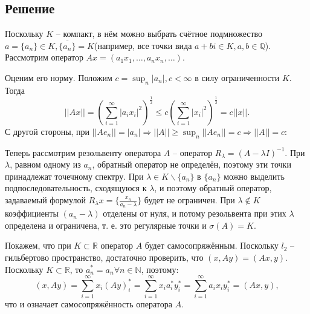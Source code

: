\documentclass[11pt]{article}
\newcounter{th}\setcounter{th}{0}
\begin{document}
\subsection{Решение}
\label{sec:org7840909}
Поскольку \(K\) -- компакт, в нём можно выбрать счётное подмножество \(a = \{a_n\} \in K, \overline{\{a_n\}} = K\)(например, все точки вида \(a + bi \in K, a, b \in \mathbb{Q}\)).
Рассмотрим оператор \(Ax = (a_1x_1, \ldots, a_nx_n, \ldots)\).

Оценим его норму. Положим \(c = \sup_n |a_n|, c < \infty\) в силу ограниченности \(K\). Тогда
\begin{equation*}
||Ax|| = \left(\sum_{i = 1}^{\infty}|a_ix_i|^2\right)^{\frac12} \leq c\left(\sum_{i = 1}^{\infty}|x_i|^2\right)^{\frac12} = c||x||.
\end{equation*}
С другой стороны, при $||Ae_n|| = |a_n| \Rightarrow ||A|| \geq \sup_n||Ae_n|| = c \Rightarrow ||A|| = c$:

Теперь рассмотрим резольвенту оператора \(A\) -- оператор \(R_{\lambda} = (A - \lambda I)^{-1}\). При \(\lambda\), равном одному из \(a_n\), обратный оператор не определён, поэтому эти точки принадлежат точечному спектру. При \(\lambda \in K \backslash \{a_n\}\) в \(\{a_n\}\) можно выделить подпоследовательность, сходящуюся к \(\lambda\), и поэтому обратный оператор, задаваемый формулой \(R_{\lambda}x = \{\frac{x_n}{a_n - \lambda}\}\) будет не ограничен. При \(\lambda \notin K\) коэффициенты \((a_n - \lambda)\) отделены от нуля, и потому резольвента при этих \(\lambda\) определена и ограничена, т. е. это регулярные точки и \(\sigma(A) = K\).

Покажем, что при \(K \subset \mathbb{R}\) оператор \(A\) будет самосопряжённым. Поскольку \(l_2\) -- гильбертово пространство, достаточно проверить, что \((x, Ay) = (Ax, y)\). Поскольку \(K \subset \mathbb{R}\), то \(a_n^* = a_n \forall n \in \mathbb{N}\), поэтому:
\begin{equation*}
(x, Ay) = \sum_{i = 1}^{\infty}x_i(Ay)_i^* = \sum_{i = 1}^{\infty}x_ia_i^*y_i^* = \sum_{i = 1}^{\infty}a_ix_iy_i^* = (Ax, y),
\end{equation*}
что и означает самосопряжённость оператора \(A\).
\end{document}
